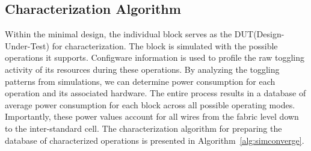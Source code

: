 \subsection{Characterization Algorithm}
Within the minimal design, the individual block serves as the DUT(Design-Under-Test) for characterization. 
The block is simulated with the possible operations it supports. 
Configware information is used to profile the raw toggling activity of its resources during these operations. 
By analyzing the toggling patterns from simulations, we can determine power consumption for each operation and its associated hardware. 
The entire process results in a database of average power consumption for each block across all possible operating modes. 
Importantly, these power values account for all wires from the fabric level down to the inter-standard cell. 
The characterization algorithm for preparing the database of characterized operations is presented in Algorithm~\ref{alg:simconverge}.

